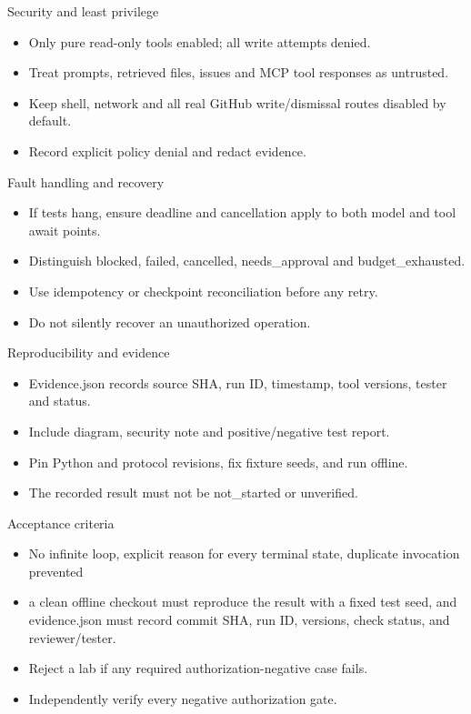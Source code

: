 \documentclass[aspectratio=169,10pt]{beamer}
\begin{document}
\begin{frame}{Security and least privilege}
\small
\begin{itemize}
\item Only pure read-only tools enabled; all write attempts denied.
\item Treat prompts, retrieved files, issues and MCP tool responses as untrusted.
\item Keep shell, network and all real GitHub write/dismissal routes disabled by default.
\item Record explicit policy denial and redact evidence.
\end{itemize}

\end{frame}

\begin{frame}{Fault handling and recovery}
\small
\begin{itemize}
\item If tests hang, ensure deadline and cancellation apply to both model and tool await points.
\item Distinguish blocked, failed, cancelled, needs\_approval and budget\_exhausted.
\item Use idempotency or checkpoint reconciliation before any retry.
\item Do not silently recover an unauthorized operation.
\end{itemize}

\end{frame}

\begin{frame}{Reproducibility and evidence}
\small
\begin{itemize}
\item Evidence.json records source SHA, run ID, timestamp, tool versions, tester and status.
\item Include diagram, security note and positive/negative test report.
\item Pin Python and protocol revisions, fix fixture seeds, and run offline.
\item The recorded result must not be not\_started or unverified.
\end{itemize}

\end{frame}

\begin{frame}{Acceptance criteria}
\small
\begin{itemize}
\item No infinite loop, explicit reason for every terminal state, duplicate invocation prevented
\item a clean offline checkout must reproduce the result with a fixed test seed, and evidence.json must record commit SHA, run ID, versions, check status, and reviewer/tester.
\item Reject a lab if any required authorization-negative case fails.
\item Independently verify every negative authorization gate.
\end{itemize}

\end{frame}
\end{document}
